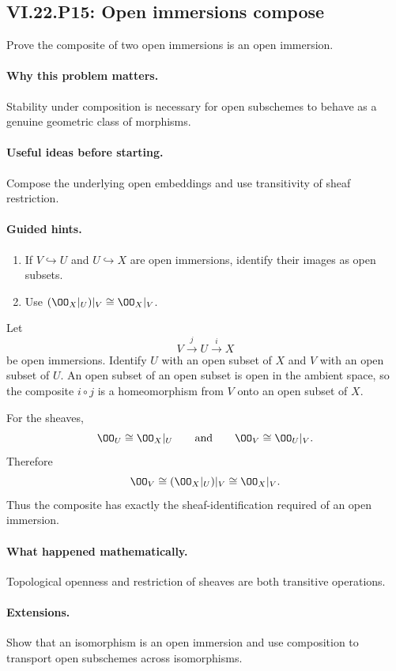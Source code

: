 \subsection*{VI.22.P15: Open immersions compose}
\begin{problem}\label{prob:vi22-p15}
Prove the composite of two open immersions is an open immersion.
\end{problem}

\ifdefined\FullProblemDossiers
\paragraph{Why this problem matters.}
Stability under composition is necessary for open subschemes to behave as a genuine geometric class of morphisms.

\paragraph{Useful ideas before starting.}
Compose the underlying open embeddings and use transitivity of sheaf restriction.

\paragraph{Guided hints.}
\begin{enumerate}
\item If $V\hookrightarrow U$ and $U\hookrightarrow X$ are open immersions, identify their images as open subsets.
\item Use $(\OO_X|_U)|_V\cong\OO_X|_V$.
\end{enumerate}

\begin{solution}
Let
\[
 V\xrightarrow{j}U\xrightarrow{i}X
\]
be open immersions.  Identify $U$ with an open subset of $X$ and $V$ with an open subset of
$U$.  An open subset of an open subset is open in the ambient space, so the composite
$i\circ j$ is a homeomorphism from $V$ onto an open subset of $X$.

For the sheaves,
\[
 \OO_U\cong\OO_X|_U
 \qquad\text{and}\qquad
 \OO_V\cong\OO_U|_V.
\]
Therefore
\[
 \OO_V
 \cong(\OO_X|_U)|_V
 \cong\OO_X|_V.
\]
Thus the composite has exactly the sheaf-identification required of an open immersion.
\end{solution}

\paragraph{What happened mathematically.}
Topological openness and restriction of sheaves are both transitive operations.

\paragraph{Extensions.}
Show that an isomorphism is an open immersion and use composition to transport open subschemes across isomorphisms.
\fi
